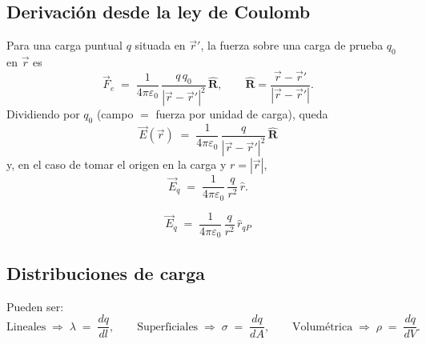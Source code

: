 \documentclass[a4paper,12pt]{article}
\begin{document}
\subsection*{Derivación desde la ley de Coulomb}
Para una carga puntual $q$ situada en $\vec r'$, la fuerza sobre una carga de prueba $q_0$ en $\vec r$ es
\[
\vec F_e \;=\; \frac{1}{4\pi\varepsilon_0}\,\frac{q\,q_0}{|\vec r-\vec r'|^2}\,\hat{\mathbf R},
\qquad \hat{\mathbf R}=\frac{\vec r-\vec r'}{|\vec r-\vec r'|}.
\]
Dividiendo por $q_0$ (campo $=$ fuerza por unidad de carga), queda
\[
\boxed{\;\vec E(\vec r)\;=\;\frac{1}{4\pi\varepsilon_0}\,\frac{q}{|\vec r-\vec r'|^2}\,\hat{\mathbf R}\;}
\]
y, en el caso de tomar el origen en la carga y $r=|\vec r|$,
\[
\vec E_q \;=\; \frac{1}{4\pi\varepsilon_0}\,\frac{q}{r^2}\,\hat r .
\]

\begin{center}
\end{center}

\[
\vec E_q \;=\; \frac{1}{4\pi\varepsilon_0}\,\frac{q}{r^2}\,\hat r_{qP}
\]

\newpage

\subsection*{Distribuciones de carga}
Pueden ser:
\[
\text{Lineales} \;\Rightarrow\; \lambda \;=\; \frac{dq}{dl},
\qquad
\text{Superficiales} \;\Rightarrow\; \sigma \;=\; \frac{dq}{dA},
\qquad
\text{Volumétrica} \;\Rightarrow\; \rho \;=\; \frac{dq}{dV}.
\]
\end{document}
